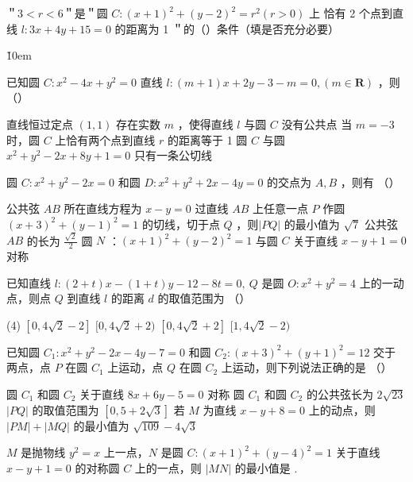 \vspace{10em}

\begin{example}
    ＂$3<r<6$＂是＂圆 $C:(x+1)^2+(y-2)^2=r^2(r>0)$ 上
    恰有 2 个点到直线 $l: 3 x+4 y+15=0$ 的距离为 1 ＂的（\quad ）条件（填是否充分必要）
\end{example}

\v{10em}

\begin{problemset}
    \item 已知圆 $C: x^2-4 x+y^2=0$ 直线 $l:(m+1) x+2 y-3-m=0,(m \in \mathbf{R})$ ，则 （\qquad）
    \begin{tasks}
        \task 直线恒过定点 $(1,1)$
        \task 存在实数 $m$ ，使得直线 $l$ 与圆 $C$ 没有公共点
        \task 当 $m=-3$ 时，圆 $C$ 上恰有两个点到直线 $r$ 的距离等于 1
        \task 圆 $C$ 与圆 $x^2+y^2-2 x+8 y+1=0$ 只有一条公切线
    \end{tasks}

    \item 圆 $C: x^2+y^2-2 x=0$ 和圆 $D: x^2+y^2+2 x-4 y=0$ 的交点为 $A, B$ ，则有 （\qquad）
    \begin{tasks}
        \task 公共弦 $A B$ 所在直线方程为 $x-y=0$
        \task 过直线 $A B$ 上任意一点 $P$ 作圆 $(x+3)^2+(y-1)^2=1$ 的切线，切于点 $Q$ ，则$|P Q|$ 的最小值为 $\sqrt{7}$
        \task 公共弦 $A B$ 的长为 $\frac{\sqrt{2}}{2}$
        \task 圆 $N$ ：$(x+1)^2+(y-2)^2=1$ 与圆 $C$ 关于直线 $x-y+1=0$ 对称
    \end{tasks}

    \item 已知直线 $l:(2+t) x-(1+t) y-12-8 t=0, ~ Q$ 是圆 $O: x^2+y^2=4$ 上的一动点，则点 $Q$ 到直线 $l$ 的距离 $d$ 的取值范围为 （\qquad）
    \begin{tasks}(4)
        \task $[0,4 \sqrt{2}-2]$
        \task $[0,4 \sqrt{2}+2)$
        \task $[0,4 \sqrt{2}+2]$
        \task $[1,4 \sqrt{2}-2)$
    \end{tasks}

    \item 已知圆 $C_1: x^2+y^2-2 x-4 y-7=0$ 和圆 $C_2:(x+3)^2+(y+1)^2=12$ 交于两点，点 $P$ 在圆 $C_1$ 上运动，点 $Q$ 在圆 $C_2$ 上运动，则下列说法正确的是 （\qquad）
    \begin{tasks}
        \task 圆 $C_1$ 和圆 $C_2$ 关于直线 $8 x+6 y-5=0$ 对称
        \task 圆 $C_1$ 和圆 $C_2$ 的公共弦长为 $2 \sqrt{23}$
        \task $|P Q|$ 的取值范围为 $[0,5+2 \sqrt{3}]$
        \task 若 $M$ 为直线 $x-y+8=0$ 上的动点，则 $|P M|+|M Q|$ 的最小值为 $\sqrt{109}-4 \sqrt{3}$
    \end{tasks}

    \item $M$ 是抛物线 $y^2=x$ 上一点，$N$ 是圆 $C:(x+1)^2+(y-4)^2=1$ 关于直线 $x-y+1=0$ 的对称圆 $C$ 上的一点，则 $|M N|$ 的最小值是 \underline{\qquad}.
\end{problemset}

